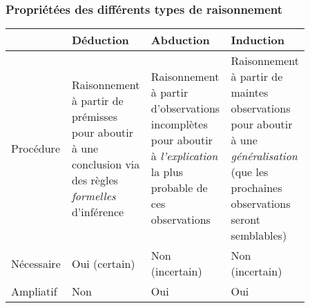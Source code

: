 \documentclass{beamer}
\begin{document}
\begin{frame}
    \frametitle{Propriétées des différents types de raisonnement}
    \begin{center}
      \begin{tabular}{ | p{0.14\linewidth} | p{0.24\linewidth} | p{0.24\linewidth} | p{0.24\linewidth} | }
        \hline \hline
         & Déduction & Abduction & Induction \\
        \hline \hline
        Procédure & Raisonnement à partir de prémisses pour aboutir à une conclusion via des règles \emph{formelles} d'inférence
                  & Raisonnement à partir d'observations incomplètes pour aboutir à \emph{l'explication}
                    la plus probable de ces observations
                  & Raisonnement à partir de maintes observations pour aboutir à une \emph{généralisation}
                    (que les prochaines observations seront semblables)
                  \\
        \hline
        Nécessaire & Oui (certain) & Non (incertain) & Non (incertain) \\
        \hline
        Ampliatif & Non & Oui & Oui \\
        \hline \hline
      \end{tabular}
    \end{center}
\end{frame}


\end{document}
